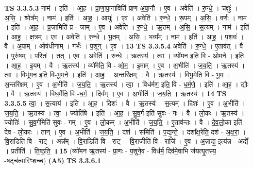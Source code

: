 \documentclass[17pt]{extarticle}
\begin{document}
                  \newline
                                \textbf{ TS 3.3.5.3} \newline
                  नाम॑ । इति॑ । आ॒ह॒ । प्रा॒णा॒पा॒नाविति॑ प्राण-अ॒पा॒नौ । ए॒व । अवेति॑ । रु॒न्धे॒ । चक्षुः॑ । अ॒सि॒ । श्रोत्र᳚म् । नाम॑ । इति॑ । आ॒ह॒ । आयुः॑ । ए॒व । अवेति॑ । रु॒न्धे॒ । रू॒पम् । अ॒सि॒ । वर्णः॑ । नाम॑ । इति॑ । आ॒ह॒ । प्र॒जामिति॑ प्र - जाम् । ए॒व । अवेति॑ । रु॒न्धे॒ । ऋ॒तम् । अ॒सि॒ । स॒त्यम् । नाम॑ । इति॑ । आ॒ह॒ । क्ष॒त्रम् । ए॒व । अवेति॑ । रु॒न्धे॒ । भू॒तम् । अ॒सि॒ । भव्य᳚म् । नाम॑ । इति॑ । आ॒ह॒ । प॒शवः॑ । वै । अ॒पाम् । ओष॑धीनाम् । गर्भः॑ । प॒शून् । ए॒व । \textbf{  13} \newline
                  \newline
                                \textbf{ TS 3.3.5.4} \newline
                  अवेति॑ । रु॒न्धे॒ । ए॒ताव॑त् । वै । पुरु॑षम् । प॒रितः॑ । तत् । ए॒व । अवेति॑ । रु॒न्धे॒ । ऋ॒तस्य॑ । त्वा॒ । व्यो॑मन॒ इति॒ वि - ओ॒म॒ने॒ । इति॑ । आ॒ह॒ । इ॒यम् । वै । ऋ॒तस्य॑ । व्यो॑मेति॒ वि - ओ॒म॒ । इ॒माम् । ए॒व । अ॒भीति॑ । ज॒य॒ति॒ । ऋ॒तस्य॑ । त्वा॒ । विभू॑मन॒ इति॒ वि-भू॒म॒ने॒ । इति॑ । आ॒ह॒ । अ॒न्तरि॑क्षम् । वै । ऋ॒तस्य॑ । विभू॒मेति॒ वि - भू॒म॒ । अ॒न्तरि॑क्षम् । ए॒व । अ॒भीति॑ । ज॒य॒ति॒ । ऋ॒तस्य॑ । त्वा॒ । विध॑र्मण॒ इति॒ वि - ध॒र्म॒णे॒ । इति॑ । आ॒ह॒ । द्यौः । वै । ऋ॒तस्य॑ । विध॒र्मेति॒ वि -ध॒र्म॒ । दिव᳚म् । ए॒व । अ॒भीति॑ । ज॒य॒ति॒ । ऋ॒तस्य॑ । \textbf{  14} \newline
                  \newline
                                \textbf{ TS 3.3.5.5} \newline
                  त्वा॒ । स॒त्याय॑ । इति॑ । आ॒ह॒ । दिशः॑ । वै । ऋ॒तस्य॑ । स॒त्यम् । दिशः॑ । ए॒व । अ॒भीति॑ । ज॒य॒ति॒ । ऋ॒तस्य॑ । त्वा॒ । ज्योति॑षे । इति॑ । आ॒ह॒ । सु॒व॒र्ग इति॑ सुवः - गः । वै । लो॒कः । ऋ॒तस्य॑ । ज्योतिः॑ । सु॒व॒र्गमिति॑ सुवः - गम् । ए॒व । लो॒कम् । अ॒भीति॑ । ज॒य॒ति॒ । ए॒ताव॑न्तः । वै । दे॒व॒लो॒का इति॑ देव - लो॒काः । तान् । ए॒व । अ॒भीति॑ । ज॒य॒ति॒ । दश॑ । समिति॑ । प॒द्य॒न्ते॒ । दशा᳚क्ष॒रेति॒ दश॑ - अ॒क्ष॒रा॒ । वि॒राडिति॑ वि - राट् । अन्न᳚म् । वि॒राडिति॑ वि - राट् । वि॒राजीति॑ वि - राजि॑ । ए॒व । अ॒न्नाद्य॒ इत्य॑न्न - अद्ये᳚ । प्रतीति॑ । ति॒ष्ठ॒ति॒ ॥ \textbf{  15} \newline
                  \newline
                      (व्यो॑मन ऋ॒तस्य॑ - प्रा॒णः - प॒शुने॒व - विध॑र्म॒ दिव॑मे॒वाभि ज॑यत्यृ॒तस्य॒ -षट्च॑त्वारिꣳशच्च)  \textbf{(A5)} \newline \newline
                                \textbf{ TS 3.3.6.1} \newline
\end{document}
